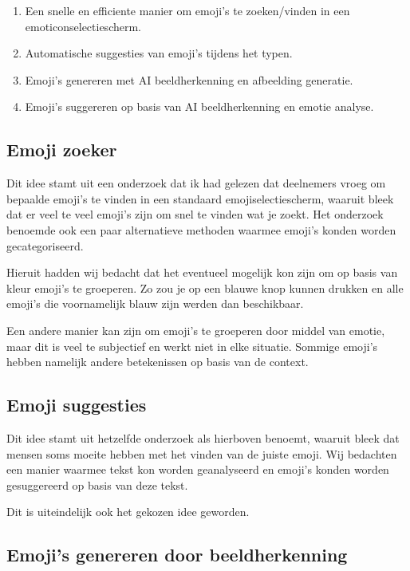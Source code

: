\documentclass[12pt]{article}
\begin{document}
\begin{enumerate}
	\item Een snelle en efficiente manier om emoji's te zoeken/vinden in een emoticonselectiescherm.
	\item Automatische suggesties van emoji's tijdens het typen.
	\item Emoji's genereren met AI beeldherkenning en afbeelding generatie.
	\item Emoji's suggereren op basis van AI beeldherkenning en emotie analyse.
\end{enumerate}

\subsection{Emoji zoeker}

Dit idee stamt uit een onderzoek dat ik had gelezen dat deelnemers vroeg om bepaalde emoji's te vinden in een standaard emojiselectiescherm, waaruit bleek dat er veel te veel emoji's zijn om snel te vinden wat je zoekt.
Het onderzoek benoemde ook een paar alternatieve methoden waarmee emoji's konden worden gecategoriseerd.

Hieruit hadden wij bedacht dat het eventueel mogelijk kon zijn om op basis van kleur emoji's te groeperen.
Zo zou je op een blauwe knop kunnen drukken en alle emoji's die voornamelijk blauw zijn werden dan beschikbaar.

Een andere manier kan zijn om emoji's te groeperen door middel van emotie, maar dit is veel te subjectief en werkt niet in elke situatie.
Sommige emoji's hebben namelijk andere betekenissen op basis van de context.

\subsection{Emoji suggesties}

Dit idee stamt uit hetzelfde onderzoek als hierboven benoemt, waaruit bleek dat mensen soms moeite hebben met het vinden van de juiste emoji.
Wij bedachten een manier waarmee tekst kon worden geanalyseerd en emoji's konden worden gesuggereerd op basis van deze tekst.

Dit is uiteindelijk ook het gekozen idee geworden.

\subsection{Emoji's genereren door beeldherkenning}
\end{document}
